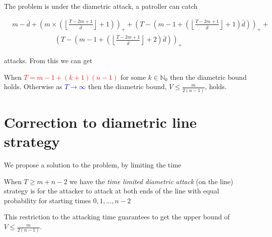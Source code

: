 \documentclass[11pt]{beamer}
\newcommand{\floor}[1]{\left \lfloor #1 \right \rfloor}
\newcommand{\pospart}[1]{\left( #1 \right)_{+}}
\begin{document}
\begin{frame}{\insertsection}

The problem is under the diametric attack, a patroller can catch
\tiny



\begin{equation}
\begin{split}
&m-\bar{d}+\pospart{m \times (\floor{\frac{T-2m+1}{\bar{d}}}+1)} +  \pospart{T-(m-1+(\floor{\frac{T-2m+1}{\bar{d}}}+1)\bar{d})} + \\
&\hspace{75pt} \pospart{T-(m-1+(\floor{\frac{T-2m+1}{\bar{d}}}+2)\bar{d})}
\end{split}
\end{equation}


\normalsize
attacks. From this we can get

\begin{lemma}
When \textcolor{red}{$T=m-1+(k+1)(n-1)$} for some $k \in \mathbb{N}_{0}$ then the diametric bound holds. Otherwise as \textcolor{blue}{$T \rightarrow \infty$} then the diametric bound, $V \leq \frac{m}{2(n-1)}$, holds.
\end{lemma}

\end{frame}


\section[]{Correction to diametric line strategy}
\hypertarget{Correction to line graph strategy}{}
\begin{frame}{\insertsection}
We propose a solution to the problem, by limiting the time

\begin{definition}
When $T \geq m+n-2$ we have the \textit{time limited diametric attack} (on the line) strategy is for the attacker to attack at both ends of the line with equal probability for starting times $0,1,...,n-2$
\end{definition}

This restriction to the attacking time guarantees to get the upper bound of $V \leq \frac{m}{2(n-1)}$.
\end{frame}
\end{document}

